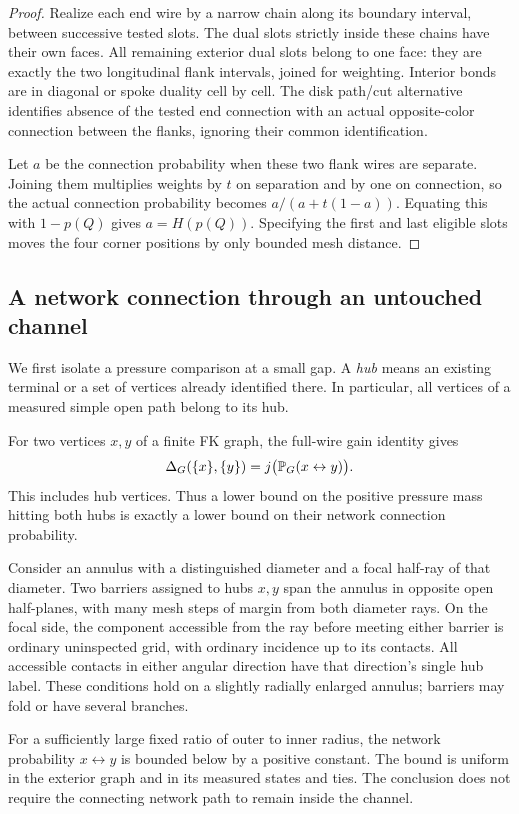 \begin{proof}
Realize each end wire by a narrow chain along its boundary interval,
between successive tested slots.  The dual slots strictly inside these
chains have their own faces.  All remaining exterior dual slots belong
to one face: they are exactly the two longitudinal flank intervals,
joined for weighting.  Interior bonds are in diagonal or spoke
duality cell by cell.  The disk path/cut alternative identifies absence
of the tested end connection with an actual opposite-color connection
between the flanks, ignoring their common identification.

Let \(a\) be the connection probability when these two flank wires
are separate.  Joining them multiplies weights by \(t\) on separation
and by one on connection, so the actual connection probability becomes
\(a/(a+t(1-a))\).  Equating this with \(1-p(Q)\) gives
\(a=H(p(Q))\).  Specifying the first and last eligible slots moves the
four corner positions by only bounded mesh distance.
\end{proof}

\subsection{A network connection through an untouched channel}

We first isolate a pressure comparison at a small gap.  A \emph{hub}
means an existing terminal or a set of vertices already identified
there.  In particular, all vertices of a measured simple open path
belong to its hub.

For two vertices $x,y$ of a finite FK graph, the full-wire gain identity
gives
\[
 \Delta_G(\{x\},\{y\})
   =j\bigl(\mathbb P_G(x\leftrightarrow y)\bigr).
\]
This includes hub vertices.  Thus a lower bound on the positive pressure
mass hitting both hubs is exactly a lower bound on their network
connection probability.

\begin{lemma}\label{disk:pressure-contact}
Consider an annulus with a distinguished diameter and a focal half-ray
of that diameter.  Two barriers assigned to hubs \(x,y\) span the
annulus in opposite open half-planes, with many mesh steps of margin
from both diameter rays.  On the focal side, the component accessible
from the ray before meeting either barrier is ordinary uninspected
grid, with ordinary incidence up to its contacts.  All accessible
contacts in either angular direction have that direction's single
hub label.  These conditions hold on a slightly radially enlarged
annulus; barriers may fold or have several branches.

For a sufficiently large fixed ratio of outer to inner radius, the
network probability \(x\leftrightarrow y\) is bounded below by a
positive constant.  The bound is uniform in the exterior graph and
in its measured states and ties.  The conclusion does not require
the connecting network path to remain inside the channel.
\end{lemma}

